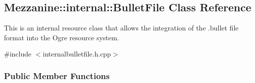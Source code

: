 \hypertarget{classMezzanine_1_1internal_1_1BulletFile}{
\subsection{Mezzanine::internal::BulletFile Class Reference}
\label{classMezzanine_1_1internal_1_1BulletFile}
}


This is an internal resource class that allows the integration of the .bullet file format into the Ogre resource system.  




{\ttfamily \#include $<$internalbulletfile.h.cpp$>$}

\subsubsection*{Public Member Functions}
